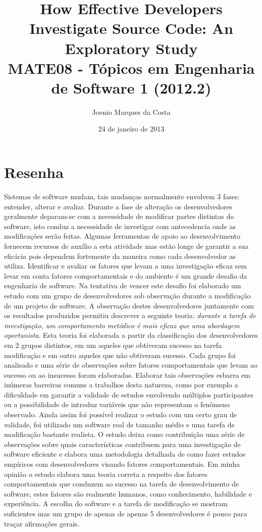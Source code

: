 \documentclass[12pt]{article}
\title{How Effective Developers Investigate Source Code: An Exploratory Study
 \cite{HowEffectiveDevelopers} \\
 \large MATE08 - Tópicos em Engenharia de Software 1 (2012.2)}
\author{Joenio Marques da Costa}
\date{24 de janeiro de 2013}
\begin{document}
\maketitle

\section*{Resenha}

Sistemas de software mudam, tais mudanças normalmente envolvem 3 fases:
entender, alterar e avaliar. Durante a fase de alteração os desenvolvedores
geralmente deparam-se com a necessidade de modificar partes distintas do
software, isto conduz a necessidade de investigar com antecedencia onde as
modificações serão feitas. Algumas ferramentas de apoio ao desenvolvimento
fornecem recursos de auxílio a esta atividade mas estão longe de garantir a
sua eficácia pois dependem fortemente da maneira como cada desenvolvedor as
utiliza. Identificar e avaliar os fatores que levam a uma investigação eficaz
sem levar em conta fatores comportamentais e do ambiente é um grande desafio
da engenharia de software. Na tentativa de vencer este desafio foi elaborado
um estudo com um grupo de desenvolvedores sob observação durante a modificação
de um projeto de software. A observação destes desenvolvedores juntamente com
os resultados produzidos permitiu descrever a seguinte teoria: {\it durante a
tarefa de investigação, um comportamento metódico é mais eficaz que uma
abordagem oportunista}. Esta teoria foi elaborada a partir da classificação
dos desenvolvedores em 2 grupos distintos, em um aqueles que obtiveram sucesso
na tarefa modificação e em outro aqueles que não obtiveram sucesso. Cada grupo
foi analisado e uma série de observações sobre fatores comportamentais que
levam ao sucesso ou ao insucesso foram elaboradas. Elaborar tais observações
esbarra em inúmeras barreiras comuns a trabalhos desta natureza, como por
exemplo a dificuldade em garantir a validade de estudos envolvendo múltiplos
participantes ou a possibilidade de introduz variáveis que não representam o
fenômeno observado. Ainda assim foi possível realizar o estudo com um certo
grau de validade, foi utilizado um software real de tamanho médio e uma tarefa
de modificação bastante realista. O estudo deixa como contribuição uma série
de observações sobre quais características contribuem para uma investigação de
software eficiente e elabora uma metodologia detalhada de como fazer estudos
empíricos com desenvolvedores visando fatores comportamentais. Em minha
opinião o estudo elabora uma teoria correta a respeito dos fatores
comportamentais que conduzem ao sucesso na tarefa de desenvolvimento de
software, estes fatores são realmente humanos, como conhecimento, habilidade e
experiência. A escolha do software e a tarefa de modificação se mostram
suficientes mas um grupo de apenas de apenas 5 desenvolvedores é pouco para
traçar afirmações gerais.
\end{document}
